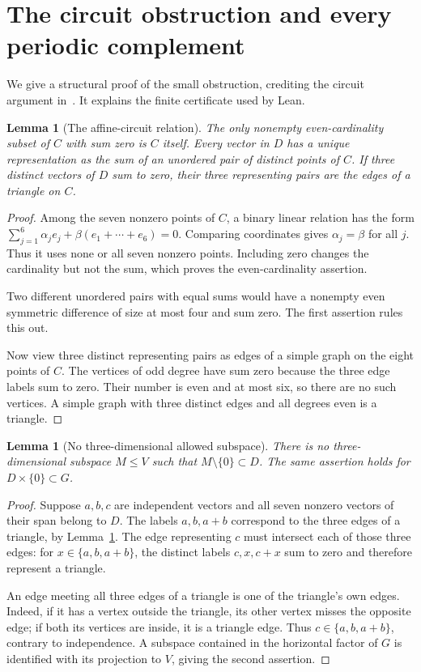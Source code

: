 \documentclass[11pt]{article}
\newtheorem{lemma}[theorem]{Lemma}
\theoremstyle{definition}\newtheorem{definition}[theorem]{Definition}
\theoremstyle{remark}\newtheorem{remark}[theorem]{Remark}
\begin{document}
\section{The circuit obstruction and every periodic complement}

We give a structural proof of the small obstruction, crediting the circuit argument in~\cite[Section~7]{fi8}. It explains the finite certificate used by Lean.

\begin{lemma}[The affine-circuit relation]\label{lem:circuit}
The only nonempty even-cardinality subset of $C$ with sum zero is $C$ itself. Every vector in $D$ has a unique representation as the sum of an unordered pair of distinct points of $C$. If three distinct vectors of $D$ sum to zero, their three representing pairs are the edges of a triangle on $C$.
\end{lemma}

\begin{proof}
Among the seven nonzero points of $C$, a binary linear relation has the form
$\sum_{j=1}^6\alpha_j e_j+\beta(e_1+\cdots+e_6)=0$. Comparing coordinates gives $\alpha_j=\beta$ for all $j$. Thus it uses none or all seven nonzero points. Including zero changes the cardinality but not the sum, which proves the even-cardinality assertion.

Two different unordered pairs with equal sums would have a nonempty even symmetric difference of size at most four and sum zero. The first assertion rules this out.

Now view three distinct representing pairs as edges of a simple graph on the eight points of $C$. The vertices of odd degree have sum zero because the three edge labels sum to zero. Their number is even and at most six, so there are no such vertices. A simple graph with three distinct edges and all degrees even is a triangle.
\end{proof}

\begin{lemma}[No three-dimensional allowed subspace]\label{lem:no3}
There is no three-dimensional subspace $M\leq V$ such that $M\setminus\{0\}\subset D$. The same assertion holds for $D\times\{0\}\subset G$.
\end{lemma}

\begin{proof}
Suppose $a,b,c$ are independent vectors and all seven nonzero vectors of their span belong to $D$. The labels $a,b,a+b$ correspond to the three edges of a triangle, by Lemma~\ref{lem:circuit}. The edge representing $c$ must intersect each of those three edges: for $x\in\{a,b,a+b\}$, the distinct labels $c,x,c+x$ sum to zero and therefore represent a triangle.

An edge meeting all three edges of a triangle is one of the triangle's own edges. Indeed, if it has a vertex outside the triangle, its other vertex misses the opposite edge; if both its vertices are inside, it is a triangle edge. Thus $c\in\{a,b,a+b\}$, contrary to independence. A subspace contained in the horizontal factor of $G$ is identified with its projection to $V$, giving the second assertion.
\end{proof}
\end{document}

